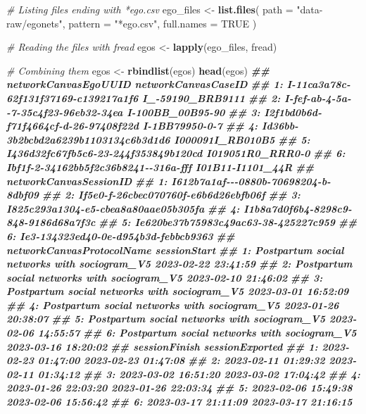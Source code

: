 \documentclass[
]{book}
\newenvironment{Shaded}{\begin{snugshade}}{\end{snugshade}}
\newcommand{\AttributeTok}[1]{\textcolor[rgb]{0.13,0.29,0.53}{#1}}
\newcommand{\CommentTok}[1]{\textcolor[rgb]{0.56,0.35,0.01}{\textit{#1}}}
\newcommand{\ConstantTok}[1]{\textcolor[rgb]{0.56,0.35,0.01}{#1}}
\newcommand{\DocumentationTok}[1]{\textcolor[rgb]{0.56,0.35,0.01}{\textbf{\textit{#1}}}}
\newcommand{\FunctionTok}[1]{\textcolor[rgb]{0.13,0.29,0.53}{\textbf{#1}}}
\newcommand{\NormalTok}[1]{#1}
\newcommand{\OtherTok}[1]{\textcolor[rgb]{0.56,0.35,0.01}{#1}}
\newcommand{\StringTok}[1]{\textcolor[rgb]{0.31,0.60,0.02}{#1}}
\begin{document}
\begin{Shaded}
\begin{Highlighting}[]
\CommentTok{\# Listing files ending with *ego.csv}
\NormalTok{ego\_files }\OtherTok{\textless{}{-}} \FunctionTok{list.files}\NormalTok{(}
  \AttributeTok{path       =} \StringTok{"data{-}raw/egonets"}\NormalTok{,}
  \AttributeTok{pattern    =} \StringTok{"*ego.csv"}\NormalTok{,}
  \AttributeTok{full.names =} \ConstantTok{TRUE}
\NormalTok{  )}

\CommentTok{\# Reading the files with fread}
\NormalTok{egos }\OtherTok{\textless{}{-}} \FunctionTok{lapply}\NormalTok{(ego\_files, fread)}

\CommentTok{\# Combining them}
\NormalTok{egos }\OtherTok{\textless{}{-}} \FunctionTok{rbindlist}\NormalTok{(egos)}
\FunctionTok{head}\NormalTok{(egos)}
\DocumentationTok{\#\#                    networkCanvasEgoUUID networkCanvasCaseID}
\DocumentationTok{\#\# 1: I{-}11ca3a78c{-}62f131f37169{-}c139217a1f6    I\_{-}59190\_BRB9111}
\DocumentationTok{\#\# 2: I{-}fef{-}ab{-}4{-}5a{-}{-}7{-}35c4f23{-}96eb32{-}34ea    I{-}100BB\_00B95{-}90}
\DocumentationTok{\#\# 3: I2f1bd0b6d{-}f71f4664cf{-}d{-}26{-}97408f22d      I{-}1BB79950{-}0{-}7}
\DocumentationTok{\#\# 4: Id36bb{-}3b2bcbd2a6239b1103134c6b3d1d6    I000091I\_RB010B5}
\DocumentationTok{\#\# 5: I436d32fc67fb5c6{-}23{-}244f353849b120cd    I019051R0\_RRR0{-}0}
\DocumentationTok{\#\# 6: Ibf1f{-}2{-}34162bb5f2c36b8241{-}{-}316a{-}fff    I01B11{-}I1101\_44R}
\DocumentationTok{\#\#                  networkCanvasSessionID}
\DocumentationTok{\#\# 1: I612b7a1af{-}{-}{-}0880b{-}70698204{-}b{-}8dbf09}
\DocumentationTok{\#\# 2: If5e0{-}f{-}26cbec070760f{-}e6b6d26ebfb06f}
\DocumentationTok{\#\# 3: I825c293a1304{-}e5{-}cbea8a80aae05b305fa}
\DocumentationTok{\#\# 4: I1b8a7d0f6b4{-}8298c9{-}848{-}9186d68a7f3c}
\DocumentationTok{\#\# 5: Ie620be37b75983c49ac63{-}38{-}425227c959}
\DocumentationTok{\#\# 6: Ie3{-}134323ed40{-}0e{-}d954b3d{-}febbcb9363}
\DocumentationTok{\#\#                       networkCanvasProtocolName        sessionStart}
\DocumentationTok{\#\# 1: Postpartum social networks with sociogram\_V5 2023{-}02{-}22 23:41:59}
\DocumentationTok{\#\# 2: Postpartum social networks with sociogram\_V5 2023{-}02{-}10 21:46:02}
\DocumentationTok{\#\# 3: Postpartum social networks with sociogram\_V5 2023{-}03{-}01 16:52:09}
\DocumentationTok{\#\# 4: Postpartum social networks with sociogram\_V5 2023{-}01{-}26 20:38:07}
\DocumentationTok{\#\# 5: Postpartum social networks with sociogram\_V5 2023{-}02{-}06 14:55:57}
\DocumentationTok{\#\# 6: Postpartum social networks with sociogram\_V5 2023{-}03{-}16 18:20:02}
\DocumentationTok{\#\#          sessionFinish     sessionExported}
\DocumentationTok{\#\# 1: 2023{-}02{-}23 01:47:00 2023{-}02{-}23 01:47:08}
\DocumentationTok{\#\# 2: 2023{-}02{-}11 01:29:32 2023{-}02{-}11 01:34:12}
\DocumentationTok{\#\# 3: 2023{-}03{-}02 16:51:20 2023{-}03{-}02 17:04:42}
\DocumentationTok{\#\# 4: 2023{-}01{-}26 22:03:20 2023{-}01{-}26 22:03:34}
\DocumentationTok{\#\# 5: 2023{-}02{-}06 15:49:38 2023{-}02{-}06 15:56:42}
\DocumentationTok{\#\# 6: 2023{-}03{-}17 21:11:09 2023{-}03{-}17 21:16:15}
\end{Highlighting}
\end{Shaded}
\end{document}
